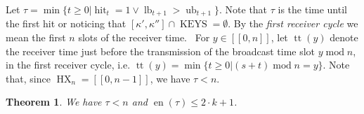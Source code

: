 \documentclass{article}
\newcommand{\tmem}[1]{{\em #1\/}}
\newcommand{\tmop}[1]{\ensuremath{\operatorname{#1}}}
\newtheorem{theorem}{Theorem}
\begin{document}
Let $\tau = \min \{t \geq 0 | \tmop{hit}_t = 1 \vee \tmop{lb}_{t + 1} >
\tmop{ub}_{t + 1} \}$. Note that $\tau$ is the time until the first hit or
noticing that $[\kappa', \kappa''] \cap \tmop{KEYS} = \emptyset$. By the
{\tmem{first receiver cycle}} we mean the first $n$ slots of the receiver
time. \ For $y \in [[0, n]]$, let $\tmop{tt} (y)$ denote the receiver time
just before the transmission of the broadcast time slot $y \tmop{mod} n$, in
the first receiver cycle, i.e. $\tmop{tt} (y) = \min \{t \geq 0 | (s + t)
\tmop{mod} n = y\}$. Note that, since $\tmop{HX}_n = [[0, n - 1]]$, we have
$\tau < n$. \

\begin{theorem}
  \label{first-hit-Theorem}We have $\tau < n$ and $\tmop{en} (\tau) \leq 2
  \cdot k + 1$. \ 
\end{theorem}
\end{document}
